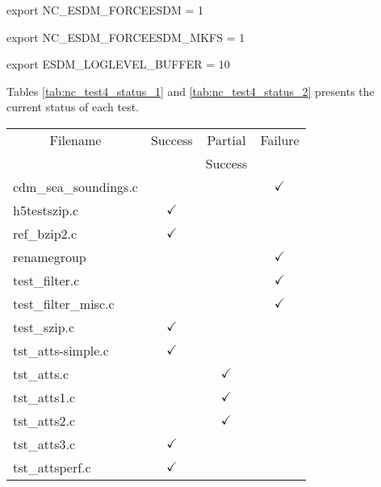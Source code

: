 \begin{framed}
\hspace{2cm} export NC\_ESDM\_FORCEESDM = 1

\hspace{2cm} export NC\_ESDM\_FORCEESDM\_MKFS = 1

\hspace{2cm} export ESDM\_LOGLEVEL\_BUFFER = 10
\end{framed}

Tables \ref{tab:nc_test4_status_1} and \ref{tab:nc_test4_status_2} presents the current status of each test.

\begin{table}[H]
\centering
\begin{tabular}{|l|c|c|c|}
\hline
\multicolumn{1}{|c|}{\parbox{8cm}{\centering Filename}} & \multicolumn{1}{c|}{Success} & \multicolumn{1}{c|}{Partial} & \multicolumn{1}{c|}{Failure} \\
                        &               & Success       &               \\ \hline \hline
cdm\_sea\_soundings.c   &               &               & $\checkmark$  \\ \hline
h5testszip.c            & $\checkmark$  &               &               \\ \hline
ref\_bzip2.c            & $\checkmark$  &               &               \\ \hline
renamegroup             &               &               & $\checkmark$  \\ \hline
test\_filter.c          &               &               & $\checkmark$  \\ \hline
test\_filter\_misc.c    &               &               & $\checkmark$  \\ \hline
test\_szip.c            & $\checkmark$  &               &               \\ \hline
tst\_atts-simple.c      & $\checkmark$  &               &               \\ \hline
tst\_atts.c             &               & $\checkmark$  &               \\ \hline
tst\_atts1.c            &               & $\checkmark$  &               \\ \hline
tst\_atts2.c            &               & $\checkmark$  &               \\ \hline
tst\_atts3.c            & $\checkmark$  &               &               \\ \hline
tst\_attsperf.c         & $\checkmark$  &               &               \\ \hline

\end{tabular}
\end{table}
